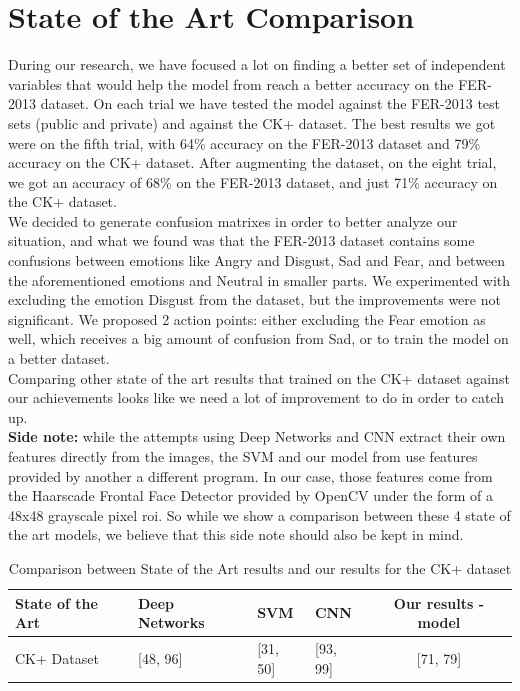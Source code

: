 \documentclass[runningheads,a4paper,11pt]{report}
\begin{document}
\clearpage
\section{State of the Art Comparison}
\label{section:soa_analysis}

During our research, we have focused a lot on finding a better set of independent variables that would help the model from \cite{Arriaga17} reach a better accuracy on the FER-2013 dataset. On each trial we have tested the model against the FER-2013 test sets (public and private) and against the CK+ dataset. The best results we got were on the fifth trial, with 64\% accuracy on the FER-2013 dataset and 79\% accuracy on the CK+ dataset. After augmenting the dataset, on the eight trial, we got an accuracy of 68\% on the FER-2013 dataset, and just 71\% accuracy on the CK+ dataset. \\
We decided to generate confusion matrixes in order to better analyze our situation, and what we found was that the FER-2013 dataset contains some confusions between emotions like Angry and Disgust, Sad and Fear, and between the aforementioned emotions and Neutral in smaller parts. We experimented with excluding the emotion Disgust from the dataset, but the improvements were not significant. We proposed 2 action points: either excluding the Fear emotion as well, which receives a big amount of confusion from Sad, or to train the model on a better dataset.\\
Comparing other state of the art results that trained on the CK+ dataset against our achievements looks like we need a lot of improvement to do in order to catch up.\\
\textbf{Side note:} while the attempts using Deep Networks \cite{Samadiani19} and CNN \cite{Burkert16} extract their own features directly from the images, the SVM \cite{Samadiani19} and our model from \cite{Arriaga17} use features provided by another a different program. In our case, those features come from the Haarscade Frontal Face Detector provided by OpenCV \cite{opencv} under the form of a 48x48 grayscale pixel roi. So while we show a comparison between these 4 state of the art models, we believe that this side note should also be kept in mind.

\begin{table}[htbp]
	\caption{Comparison between State of the Art results and our results for the CK+ dataset}
	\label{state_of_the_art_comparison}
		\begin{center}
			\begin{tabular}{p{100pt}p{100pt}p{60pt}p{60pt}c}
				\textbf{State of the Art}& \textbf{Deep Networks \cite{Samadiani19}}& \textbf{SVM \cite{Samadiani19}}& \textbf{CNN \cite{Burkert16}}& \textbf{Our results - model \cite{Arriaga17}} \\
				\hline\hline
				CK+ Dataset& [48, 96]& [31, 50]& [93, 99]& [71, 79] \\
				\hline
			\end{tabular}
		\end{center}
\end{table}
\end{document}
